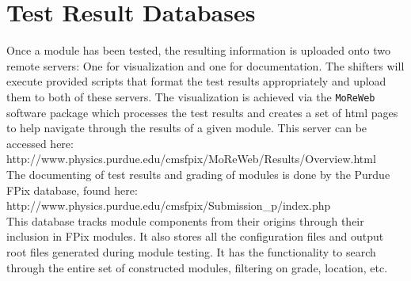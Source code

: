 \section{Test Result Databases}
\label{s:uploading}



Once a module has been tested, the resulting information is uploaded onto two remote servers:
One for visualization and one for documentation.
The shifters will execute provided scripts that format the test results appropriately 
and upload them to both of these servers.
The visualization is achieved via the {\tt MoReWeb} software package which processes the test results
and creates a set of html pages to help navigate through the results of a given module.
This server can be accessed here: 
\\
http://www.physics.purdue.edu/cmsfpix/MoReWeb/Results/Overview.html
\\
The documenting of test results and grading of modules is done by the Purdue FPix database, found here: 
\\
http://www.physics.purdue.edu/cmsfpix/Submission\_p/index.php
\\
This database tracks module components from their origins through their inclusion in FPix modules.
It also stores all the configuration files and output root files generated during module testing.  
It has the functionality to search through the entire set of constructed modules, filtering on grade, location, etc.


